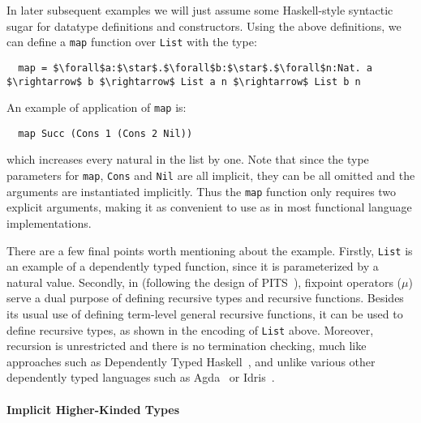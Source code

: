 \noindent
In later subsequent examples we will just assume some
Haskell-style syntactic sugar for datatype definitions and constructors.
Using the above definitions, we can define a \lstinline{map} function over \lstinline{List} with the type:
\begin{lstlisting}
  map = $\forall$a:$\star$.$\forall$b:$\star$.$\forall$n:Nat. a $\rightarrow$ b $\rightarrow$ List a n $\rightarrow$ List b n
\end{lstlisting}
An example of application of \lstinline{map} is:
\begin{lstlisting}
  map Succ (Cons 1 (Cons 2 Nil))
\end{lstlisting}
\noindent which increases every natural in the list by one.
Note that since the type parameters for \lstinline{map}, \lstinline{Cons} and \lstinline{Nil}
are all implicit, they can be all omitted
and the arguments are instantiated implicitly. Thus the \lstinline{map} function
only requires two explicit arguments, making it as convenient to use
as in most functional language implementations.

There are a few final points worth mentioning about the example.
Firstly, \lstinline{List} is an example of a dependently typed function, since it is parameterized
by a natural value. Secondly, in \name (following the design of PITS~\cite{yang2019pure}),
fixpoint operators ($\mu$) serve a dual purpose of defining recursive types and recursive
functions. Besides its usual use of defining term-level general recursive functions,
it can be used to define recursive types, as shown in the encoding of \lstinline{List}
above.
Moreover, recursion is unrestricted and there is no termination checking, much like approaches
such as Dependently Typed Haskell~\cite{dh}, and unlike various other dependently typed languages
such as Agda~\cite{2007_norell_agda} or Idris~\cite{brady2013idris}.

\paragraph{Implicit Higher-Kinded Types}


